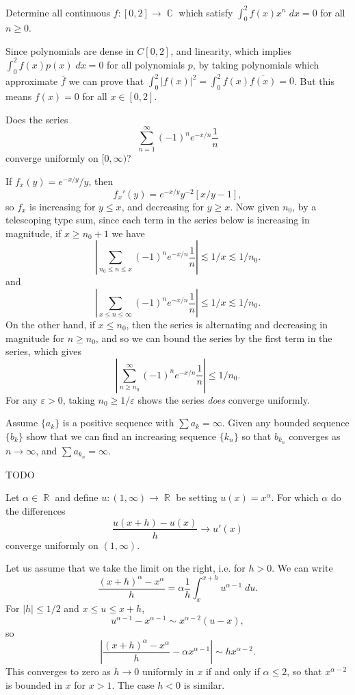 \documentclass[answers]{exam}
\DeclareMathOperator{\CC}{\mathbb{C}}
\DeclareMathOperator{\RR}{\mathbb{R}}
\begin{document}
\begin{questions}
\question Determine all continuous $f: [0,2] \to \CC$ which satisfy $\int_0^2 f(x) x^n\; dx = 0$ for all $n \geq 0$.
\begin{solution}
	Since polynomials are dense in $C[0,2]$, and linearity, which implies $\int_0^2 f(x) p(x)\; dx = 0$ for all polynomials $p$, by taking polynomials which approximate $\overline{f}$ we can prove that $\int_0^2 |f(x)|^2 = \int_0^2 f(x) \overline{f(x)} = 0$. But this means $f(x) = 0$ for all $x \in [0,2]$.
\end{solution}

\question Does the series
%
\[ \sum_{n = 1}^\infty (-1)^n e^{-x/n} \frac{1}{n} \]
%
converge uniformly on $[0,\infty)$?
\begin{solution}
	If $f_x(y) = e^{-x/y} / y$, then
	\[ f_x'(y) = e^{-x/y} y^{-2} [x/y -1], \]
	so $f_x$ is increasing for $y \leq x$, and decreasing for $y \geq x$. Now given $n_0$, by a telescoping type sum, since each term in the series below is increasing in magnitude, if $x \geq n_0 + 1$ we have
	\[ \left| \sum_{n_0 \leq n \leq x} (-1)^n e^{-x/n} \frac{1}{n} \right| \lesssim 1/x \lesssim 1/n_0. \]
	and
	\[ \left| \sum_{x \leq n \leq \infty} (-1)^n e^{-x/n} \frac{1}{n} \right| \leq 1/x \lesssim 1/n_0. \]
	On the other hand, if $x \leq n_0$, then the series is alternating and decreasing in magnitude for $n \geq n_0$, and so we can bound the series by the first term in the series, which gives
	\[ \left| \sum_{n \geq n_0}^\infty (-1)^n e^{-x/n} \frac{1}{n} \right| \leq 1 / n_0. \]
	For any $\varepsilon > 0$, taking $n_0 \geq 1/\varepsilon$ shows the series \emph{does} converge uniformly.
\end{solution}

\question Assume $\{ a_k \}$ is a positive sequence with $\sum a_k = \infty$. Given any bounded sequence $\{ b_k \}$ show that we can find an increasing sequence $\{ k_n \}$ so that $b_{k_n}$ converges as $n \to \infty$, and $\sum a_{k_n} = \infty$.
\begin{solution}
	TODO
\end{solution}

\question Let $\alpha \in \RR$ and define $u: (1,\infty) \to \RR$ be setting $u(x) = x^\alpha$. For which $\alpha$ do the differences
%
\[ \frac{u(x+h) - u(x)}{h} \to u'(x) \]
%
converge uniformly on $(1,\infty)$.
\begin{solution}
	Let us assume that we take the limit on the right, i.e. for $h > 0$. We can write
	\[ \frac{(x + h)^\alpha - x^\alpha}{h} = \alpha \frac{1}{h} \int_x^{x + h} u^{\alpha - 1}\; du. \]
	For $|h| \leq 1/2$ and $x \leq u \leq x + h$,
	\[ u^{\alpha - 1} - x^{\alpha - 1} \sim x^{\alpha - 2} (u - x), \]
	so
	\[ |\frac{(x+h)^\alpha - x^\alpha}{h} - \alpha x^{\alpha - 1}| \sim h x^{\alpha - 2}. \]
	This converges to zero as $h \to 0$ uniformly in $x$ if and only if $\alpha \leq 2$, so that $x^{\alpha - 2}$ is bounded in $x$ for $x > 1$. The case $h < 0$ is similar.
\end{solution}


\end{questions}
\end{document}
